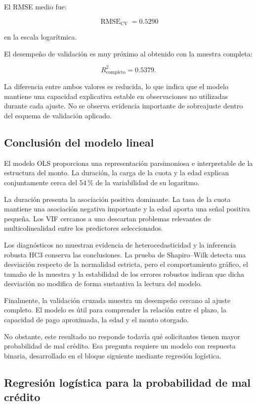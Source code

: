 El RMSE medio fue:

\[
\operatorname{RMSE}_{\mathrm{CV}}
=
\num{0.5290}
\]

en la escala logarítmica.

El desempeño de validación es muy próximo al obtenido con la muestra
completa:

\[
R^2_{\mathrm{completo}}=\num{0.5379}.
\]

La diferencia entre ambos valores es reducida, lo que indica que el
modelo mantiene una capacidad explicativa estable en observaciones no
utilizadas durante cada ajuste. No se observa evidencia importante de
sobreajuste dentro del esquema de validación aplicado.

\subsection{Conclusión del modelo lineal}

El modelo OLS proporciona una representación parsimoniosa e
interpretable de la estructura del monto. La duración, la carga de la
cuota y la edad explican conjuntamente cerca del \(54\,\%\) de la
variabilidad de su logaritmo.

La duración presenta la asociación positiva dominante. La tasa de la
cuota mantiene una asociación negativa importante y la edad aporta una
señal positiva pequeña. Los VIF cercanos a uno descartan problemas
relevantes de multicolinealidad entre los predictores seleccionados.

Los diagnósticos no muestran evidencia de heterocedasticidad y la
inferencia robusta HC3 conserva las conclusiones. La prueba de
Shapiro--Wilk detecta una desviación respecto de la normalidad estricta,
pero el comportamiento gráfico, el tamaño de la muestra y la estabilidad
de los errores robustos indican que dicha desviación no modifica de forma
sustantiva la lectura del modelo.

Finalmente, la validación cruzada muestra un desempeño cercano al ajuste
completo. El modelo es útil para comprender la relación entre el plazo,
la capacidad de pago aproximada, la edad y el monto otorgado.

No obstante, este resultado no responde todavía qué solicitantes tienen
mayor probabilidad de mal crédito. Esa pregunta requiere un modelo con
respuesta binaria, desarrollado en el bloque siguiente mediante
regresión logística.

\subsection{Regresión logística para la probabilidad de mal crédito}
\label{subsec:logit}

